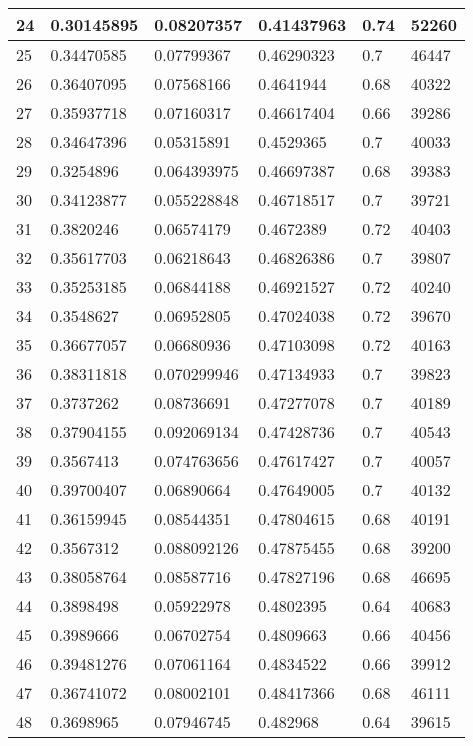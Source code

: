 \begin{longtable}{|l|l|l|l|l|l|}
24 & 0.30145895 & 0.08207357 & 0.41437963 & 0.74 & 52260 \\ \hline 
25 & 0.34470585 & 0.07799367 & 0.46290323 & 0.7 & 46447 \\ \hline 
26 & 0.36407095 & 0.07568166 & 0.4641944 & 0.68 & 40322 \\ \hline 
27 & 0.35937718 & 0.07160317 & 0.46617404 & 0.66 & 39286 \\ \hline 
28 & 0.34647396 & 0.05315891 & 0.4529365 & 0.7 & 40033 \\ \hline 
29 & 0.3254896 & 0.064393975 & 0.46697387 & 0.68 & 39383 \\ \hline 
30 & 0.34123877 & 0.055228848 & 0.46718517 & 0.7 & 39721 \\ \hline 
31 & 0.3820246 & 0.06574179 & 0.4672389 & 0.72 & 40403 \\ \hline 
32 & 0.35617703 & 0.06218643 & 0.46826386 & 0.7 & 39807 \\ \hline 
33 & 0.35253185 & 0.06844188 & 0.46921527 & 0.72 & 40240 \\ \hline 
34 & 0.3548627 & 0.06952805 & 0.47024038 & 0.72 & 39670 \\ \hline 
35 & 0.36677057 & 0.06680936 & 0.47103098 & 0.72 & 40163 \\ \hline 
36 & 0.38311818 & 0.070299946 & 0.47134933 & 0.7 & 39823 \\ \hline 
37 & 0.3737262 & 0.08736691 & 0.47277078 & 0.7 & 40189 \\ \hline 
38 & 0.37904155 & 0.092069134 & 0.47428736 & 0.7 & 40543 \\ \hline 
39 & 0.3567413 & 0.074763656 & 0.47617427 & 0.7 & 40057 \\ \hline 
40 & 0.39700407 & 0.06890664 & 0.47649005 & 0.7 & 40132 \\ \hline 
41 & 0.36159945 & 0.08544351 & 0.47804615 & 0.68 & 40191 \\ \hline 
42 & 0.3567312 & 0.088092126 & 0.47875455 & 0.68 & 39200 \\ \hline 
43 & 0.38058764 & 0.08587716 & 0.47827196 & 0.68 & 46695 \\ \hline 
44 & 0.3898498 & 0.05922978 & 0.4802395 & 0.64 & 40683 \\ \hline 
45 & 0.3989666 & 0.06702754 & 0.4809663 & 0.66 & 40456 \\ \hline 
46 & 0.39481276 & 0.07061164 & 0.4834522 & 0.66 & 39912 \\ \hline 
47 & 0.36741072 & 0.08002101 & 0.48417366 & 0.68 & 46111 \\ \hline 
48 & 0.3698965 & 0.07946745 & 0.482968 & 0.64 & 39615 \\ \hline 

\end{longtable}

